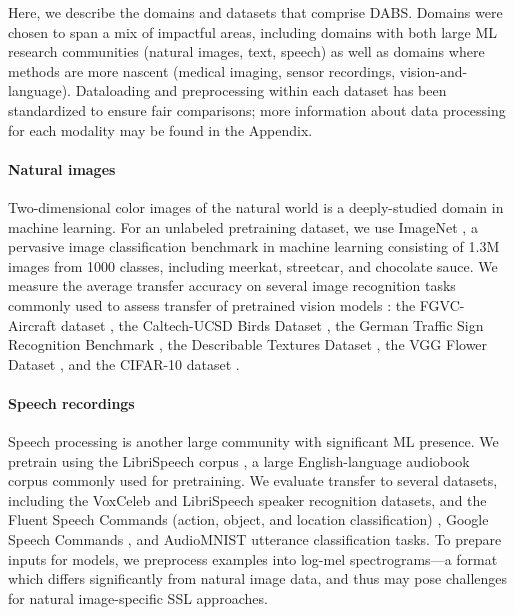 \documentclass{article}
\begin{document}
Here, we describe the domains and datasets that comprise DABS. Domains were chosen to span a mix of impactful areas, including domains with both large ML research communities (natural images, text, speech) as well as domains where methods are more nascent (medical imaging, sensor recordings, vision-and-language). Dataloading and preprocessing within each dataset has been standardized to ensure fair comparisons; more information about data processing for each modality may be found in the Appendix.

\paragraph{Natural images} Two-dimensional color images of the natural world is a deeply-studied domain in machine learning. For an unlabeled pretraining dataset, we use ImageNet \citep{Russakovsky2015ImageNetLS}, a pervasive image classification benchmark in machine learning consisting of 1.3M images from 1000 classes, including meerkat, streetcar, and chocolate sauce. We measure the average transfer accuracy on several image recognition tasks commonly used to assess transfer of pretrained vision models \citep{Chen2020ASF, Grill2020BootstrapYO}: 
the FGVC-Aircraft dataset \citep{maji13fine-grained},
the Caltech-UCSD Birds Dataset \citep{WelinderEtal2010},
the German Traffic Sign Recognition Benchmark \citep{Houben-IJCNN-2013},
the Describable Textures Dataset \citep[][DTD]{cimpoi14describing}, the VGG Flower Dataset \citep{Nilsback2008AutomatedFC}, and the CIFAR-10 dataset \citep{Krizhevsky2009LearningML}.

\paragraph{Speech recordings} Speech processing is another large community with significant ML presence. We pretrain using the LibriSpeech corpus \citep{Panayotov2015LibrispeechAA}, a large English-language audiobook corpus commonly used for pretraining. We evaluate transfer to several datasets, including the VoxCeleb \citep{Nagrani17} and LibriSpeech \citep{Panayotov2015LibrispeechAA} speaker recognition datasets, and the Fluent Speech Commands (action, object, and location classification) \citep[]{Lugosch2019SpeechMP}, Google Speech Commands \citep{speechcommandsv2}, and AudioMNIST \citep{becker2018interpreting} utterance classification tasks. To prepare inputs for models, we preprocess examples into log-mel spectrograms---a format which differs significantly from natural image data, and thus may pose challenges for natural image-specific SSL approaches.
\end{document}
